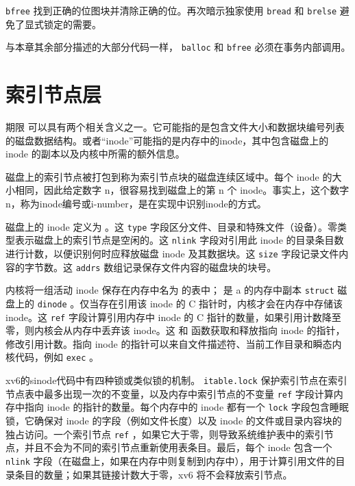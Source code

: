 \documentclass[UTF8]{article}
\begin{document}
   \lstinline{bfree}   
        找到正确的位图块并清除正确的位。再次暗示独家使用
    \lstinline{bread}    和
    \lstinline{brelse}    避免了显式锁定的需要。  

与本章其余部分描述的大部分代码一样，
    \lstinline{balloc}    和
    \lstinline{bfree}    必须在事务内部调用。
    \section{索引节点层  }     

期限
        可以具有两个相关含义之一。它可能指的是包含文件大小和数据块编号列表的磁盘数据结构。或者“inode”可能指的是内存中的inode，其中包含磁盘上的inode 的副本以及内核中所需的额外信息。  

磁盘上的索引节点被打包到称为索引节点块的磁盘连续区域中。每个 inode 的大小相同，因此给定数字 n，很容易找到磁盘上的第 n 个 inode。事实上，这个数字n，称为inode编号或i-number，是在实现中识别inode的方式。  

磁盘上的 inode 定义为
        。这
    \lstinline{type}    字段区分文件、目录和特殊文件（设备）。零类型表示磁盘上的索引节点是空闲的。这
    \lstinline{nlink}    字段对引用此 inode 的目录条目数进行计数，以便识别何时应释放磁盘 inode 及其数据块。这
    \lstinline{size}   字段记录文件内容的字节数。这
    \lstinline{addrs}    数组记录保存文件内容的磁盘块的块号。  

内核将一组活动 inode 保存在内存中名为        的表中；
        是 a 的内存中副本
    \lstinline{struct}   
 磁盘上的    \lstinline{dinode}   。仅当存在引用该 inode 的 C 指针时，内核才会在内存中存储该 inode。这
    \lstinline{ref}    字段计算引用内存中 inode 的 C 指针的数量，如果引用计数降至零，则内核会从内存中丢弃该 inode。这
        和
        函数获取和释放指向 inode 的指针，修改引用计数。指向 inode 的指针可以来自文件描述符、当前工作目录和瞬态内核代码，例如
    \lstinline{exec}    。  

xv6的sinode代码中有四种锁或类似锁的机制。
    \lstinline{itable.lock}    保护索引节点在索引节点表中最多出现一次的不变量，以及内存中索引节点的不变量
    \lstinline{ref}    字段计算内存中指向 inode 的指针的数量。每个内存中的 inode 都有一个
    \lstinline{lock}    字段包含睡眠锁，它确保对 inode 的字段（例如文件长度）以及 inode 的文件或目录内容块的独占访问。一个索引节点
    \lstinline{ref}   ，如果它大于零，则导致系统维护表中的索引节点，并且不会为不同的索引节点重新使用表条目。最后，每个 inode 包含一个
    \lstinline{nlink}    字段（在磁盘上，如果在内存中则复制到内存中），用于计算引用文件的目录条目的数量；如果其链接计数大于零，xv6 将不会释放索引节点。  
\end{document}
